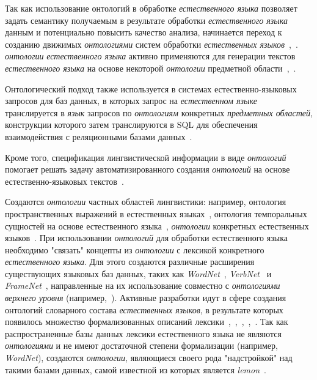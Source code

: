 Так как использование онтологий в обработке \textit{естественного языка} позволяет задать семантику получаемым в результате обработки \textit{естественного языка} данным и потенциально повысить качество анализа, начинается переход к созданию движимых \textit{онтологиями} систем обработки \textit{естественных языков}~\cite{Kostareva2016},~\cite{Nevzorova2019}.
    \textit{онтологии} \textit{естественного языка} активно применяются для генерации текстов \textit{естественного языка} на основе некоторой \textit{онтологии} предметной области~\cite{Cimiano2013},~\cite{Bouayad_2014}.

Онтологический подход также используется в системах естественно-языковых запросов для баз данных, в которых запрос на \textit{естественном языке} транслируется в \textit{язык} запросов по \textit{онтологиям} конкретных \textit{предметных областей}, конструкции которого затем транслируются в SQL для обеспечения взаимодействия с реляционными базами данных~\cite{saha_2016}.

Кроме того, спецификация лингвистической информации в виде \textit{онтологий} помогает решать задачу автоматизированного создания \textit{онтологий} на основе естественно-языковых текстов~\cite{SHAMSFARD200417}.

Создаются \textit{онтологии} частных областей лингвистики: например, онтология пространственных выражений в естественных языках~\cite{BATEMAN20101027}, онтология темпоральных сущностей на основе естественного языка~\cite{Moens_1987}, \textit{онтологии} конкретных естественных языков~\cite{Dobrov_2018}.
При использовании \textit{онтологий} для обработки естественного языка необходимо "связать"{} концепты из \textit{онтологии} с лексикой конкретного \textit{естественного языка}.
Для этого создаются различные расширения существующих языковых баз данных, таких как \textit{WordNet}~\cite{wordnet}, \textit{VerbNet}~\cite{verbnet} и \textit{FrameNet}~\cite{framenet}, направленные на их использование совместно с \textit{онтологиями верхнего уровня} (например,~\cite{pease_fellbaum_2010}).
Активные разработки идут в сфере создания онтологий словарного состава \textit{естественных языков}, в результате которых появилось множество формализованных описаний лексики~\cite{matsukawa-yokota-1991-development},~\cite{calzolari_1991},~\cite{buitelaar2006linginfo},~\cite{Cimiano2007LexOntoAM},~\cite{buitelaar_2006}.
Так как распространенные базы данных лексики естественного языка не являются \textit{онтологиями} и не имеют достаточной степени формализации (например, \textit{WordNet}), создаются \textit{онтологии}, являющиеся своего рода "надстройкой"{} над такими базами данных, самой известной из которых является \textit{lemon}~\cite{McCrae_2012}.

